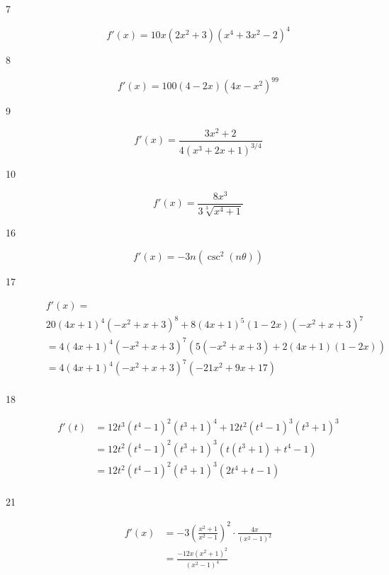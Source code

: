 \documentclass[letterpaper, landscape]{exam}
\begin{document}
\begin{description}
    \item[7] 
      \[
        f'(x) = \boxed{ 10x \left(2x^2 + 3 \right) \left(x^4 + 3x^2 - 2 \right)^4 }
      \]

    \item[8] 
      \[
        f'(x) = \boxed{ 100 \left( 4 - 2x \right) \left( 4x - x^2 \right)^{99} } 
      \]

    \item[9] 
      \[
        f'(x) = \boxed{ \frac{3x^2 + 2}{4 \left(x^3 + 2x + 1 \right)^{3/4}} }
      \]

    \item[10] 
      \[
        f'(x) = \boxed{ \frac{8x^3}{3 \sqrt[3]{x^4 + 1}} }
      \]

    \item[16] 
      \[
        f'(x) = \boxed{ - 3n \left( \csc ^2 (n \theta) \right) }
      \]

    \item[17] 
      \begin{align*}
         & f'(x) = \\
         & 20 (4x + 1)^4 \left( - x^2 + x + 3\right)^8 + 8 (4x + 1)^5 (1 - 2x) \left( - x^2 + x + 3\right)^7 \\
         & = 4 (4x + 1)^4 \left( - x^2 + x + 3\right)^7 \left( 5 \left( - x^2 + x + 3\right) + 2(4x + 1)(1 - 2x) \right) \\
         & = \boxed{ 4 (4x + 1)^4 \left( - x^2 + x + 3\right)^7 \left( - 21x^2 + 9x + 17 \right) } \\
      \end{align*}

    \item[18] 
      \begin{align*}
        f'(t) & = 12 t^3 \left(t^4 - 1\right)^2 \left(t^3 + 1\right)^4 + 12 t^2 \left(t^4 - 1\right)^3 \left(t^3 + 1\right)^3 \\
              & = 12 t^2 \left(t^4 - 1\right)^2 \left(t^3 + 1\right)^3 \left( t \left( t^3 + 1 \right) + t^4 - 1 \right) \\
              & = \boxed{ 12 t^2 \left(t^4 - 1\right)^2 \left(t^3 + 1\right)^3 \left( 2t^4 + t - 1 \right) } \\
      \end{align*}

    \item[21] 
      \begin{align*}
        f'(x) & = -3 \left( \frac{x^2 + 1}{x^2 - 1} \right)^2 \cdot \frac{4x}{\left(x^2-1\right)^2}  \\
              & = \boxed{ \frac{-12x \left( x^2 + 1 \right)^2}{\left( x^2 - 1 \right)^4} } \\
      \end{align*}


\end{description}
\end{document}
